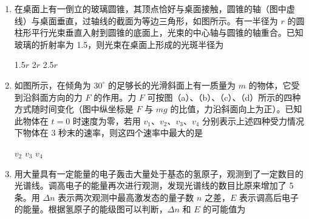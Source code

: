 \documentclass[\gkver]{gaokaozhenti}
\begin{document}
\begin{enumerate}
\item
在桌面上有一倒立的玻璃圆锥，其顶点恰好与桌面接触，圆锥的轴（图中虚线）与桌面垂直，过轴线的截面为等边三角形，如图所示。有一半径为 $r$ 的圆柱形平行光束垂直入射到圆锥的底面上，光束的中心轴与圆锥的轴重合。已知玻璃的折射率为 1.5，则光束在桌面上形成的光斑半径为


{1.5$r$}
{2$r$}
{2.5$r$}

\item
如图所示，在倾角为 $30^{\circ}$ 的足够长的光滑斜面上有一质量为 $m$ 的物体，它受到沿斜面方向的力 $F$ 的作用。力 $F$ 可按图（a）、（b）、（c）、（d）所示的四种方式随时间变化（图中纵坐标是 $F$ 与 $mg$ 的比值，力沿斜面向上为正）。已知此物体在 $t=0$ 时速度为零，若用 $v_{1}$、$v_{2}$、$v_{3}$、$v_{4}$ 分别表示上述四种受力情况下物体在 3 秒末的速率，则这四个速率中最大的是



{$v_{2}$}
{$v_{3}$}
{$v_{4}$}

\item
用大量具有一定能量的电子轰击大量处于基态的氢原子，观测到了一定数目的光谱线。调高电子的能量再次进行观测，发现光谱线的数目比原来增加了 5 条。用 $\Delta n$ 表示两次观测中最高激发态的量子数 $n$ 之差，$E$ 表示调高后电子的能量。根据氢原子的能级图可以判断，$\Delta n$ 和 $E$ 的可能值为


\end{enumerate}
\end{document}
